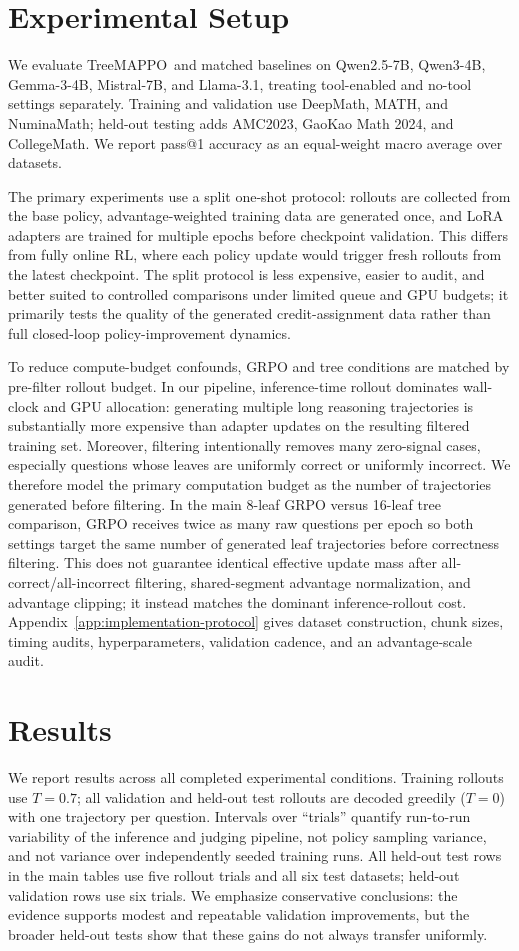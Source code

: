 \documentclass{article}
\newcommand{\ours}{TreeMAPPO\xspace}
\begin{document}
\section{Experimental Setup}
We evaluate \ours\ and matched baselines on Qwen2.5-7B, Qwen3-4B, Gemma-3-4B, Mistral-7B, and Llama-3.1, treating tool-enabled and no-tool settings separately. Training and validation use DeepMath, MATH, and NuminaMath; held-out testing adds AMC2023, GaoKao Math 2024, and CollegeMath. We report pass@1 accuracy as an equal-weight macro average over datasets.

The primary experiments use a split one-shot protocol: rollouts are collected from the base policy, advantage-weighted training data are generated once, and LoRA adapters are trained for multiple epochs before checkpoint validation. This differs from fully online RL, where each policy update would trigger fresh rollouts from the latest checkpoint. The split protocol is less expensive, easier to audit, and better suited to controlled comparisons under limited queue and GPU budgets; it primarily tests the quality of the generated credit-assignment data rather than full closed-loop policy-improvement dynamics.

To reduce compute-budget confounds, GRPO and tree conditions are matched by pre-filter rollout budget. In our pipeline, inference-time rollout dominates wall-clock and GPU allocation: generating multiple long reasoning trajectories is substantially more expensive than adapter updates on the resulting filtered training set. Moreover, filtering intentionally removes many zero-signal cases, especially questions whose leaves are uniformly correct or uniformly incorrect. We therefore model the primary computation budget as the number of trajectories generated before filtering. In the main 8-leaf GRPO versus 16-leaf tree comparison, GRPO receives twice as many raw questions per epoch so both settings target the same number of generated leaf trajectories before correctness filtering. This does not guarantee identical effective update mass after all-correct/all-incorrect filtering, shared-segment advantage normalization, and advantage clipping; it instead matches the dominant inference-rollout cost. Appendix~\ref{app:implementation-protocol} gives dataset construction, chunk sizes, timing audits, hyperparameters, validation cadence, and an advantage-scale audit.


\section{Results}
We report results across all completed experimental conditions. Training rollouts use $T=0.7$; all validation and held-out test rollouts are decoded greedily ($T=0$) with one trajectory per question. Intervals over ``trials'' quantify run-to-run variability of the inference and judging pipeline, not policy sampling variance, and not variance over independently seeded training runs. All held-out test rows in the main tables use five rollout trials and all six test datasets; held-out validation rows use six trials. We emphasize conservative conclusions: the evidence supports modest and repeatable validation improvements, but the broader held-out tests show that these gains do not always transfer uniformly.
\end{document}
